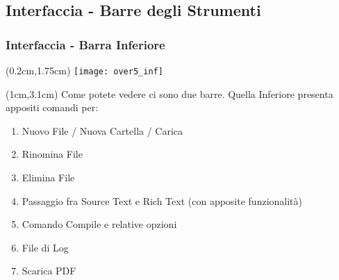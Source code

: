 \subsection{Interfaccia - Barre degli Strumenti}

\begin{frame}

  \frametitle{Interfaccia - Barra Inferiore}
  
  \begin{textblock*}{20cm}(0.2cm,1.75cm)
    \texttt{[image: over5\_inf]}
  \end{textblock*}

  \begin{textblock*}{20cm}(1cm,3.1cm)
    Come potete vedere ci sono due barre.\newline
    Quella Inferiore presenta appositi comandi per:\newline
    \begin{enumerate}
       \item Nuovo File / Nuova Cartella / Carica
       \item Rinomina File
       \item Elimina File
       \item Passaggio fra Source Text e Rich Text (con apposite funzionalità)
       \item Comando Compile e relative opzioni
       \item File di Log
       \item Scarica PDF
    \end{enumerate}
  \end{textblock*}
  

\end{frame}

